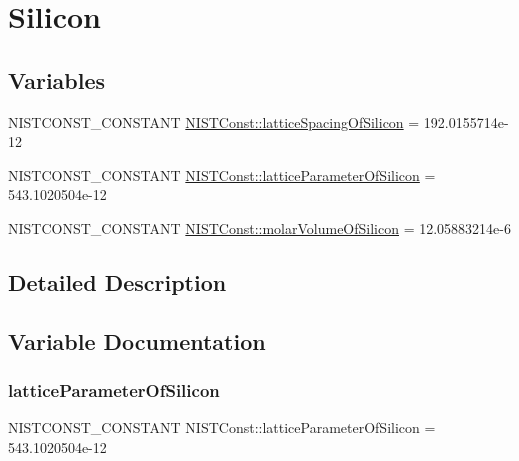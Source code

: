 \hypertarget{group___n_i_s_t_const-_silicon}{}\section{Silicon}
\label{group___n_i_s_t_const-_silicon}
\subsection*{Variables}
\begin{DoxyCompactItemize}
\item 
N\+I\+S\+T\+C\+O\+N\+S\+T\+\_\+\+C\+O\+N\+S\+T\+A\+NT \mbox{\hyperlink{group___n_i_s_t_const-_silicon_gadcadfe51b35f339a221e8ba56830b565}{N\+I\+S\+T\+Const\+::lattice\+Spacing\+Of\+Silicon}} = 192.\+0155714e-\/12
\item 
N\+I\+S\+T\+C\+O\+N\+S\+T\+\_\+\+C\+O\+N\+S\+T\+A\+NT \mbox{\hyperlink{group___n_i_s_t_const-_silicon_ga0941ec097c5c66b571eec8c5305f3aac}{N\+I\+S\+T\+Const\+::lattice\+Parameter\+Of\+Silicon}} = 543.\+1020504e-\/12
\item 
N\+I\+S\+T\+C\+O\+N\+S\+T\+\_\+\+C\+O\+N\+S\+T\+A\+NT \mbox{\hyperlink{group___n_i_s_t_const-_silicon_ga5bd73eb57f2a0142f761e2aee3afdcfb}{N\+I\+S\+T\+Const\+::molar\+Volume\+Of\+Silicon}} = 12.\+05883214e-\/6
\end{DoxyCompactItemize}


\subsection{Detailed Description}


\subsection{Variable Documentation}
\mbox{\label{group___n_i_s_t_const-_silicon_ga0941ec097c5c66b571eec8c5305f3aac}} 
\subsubsection{\texorpdfstring{lattice\+Parameter\+Of\+Silicon}{latticeParameterOfSilicon}}
{\footnotesize\ttfamily N\+I\+S\+T\+C\+O\+N\+S\+T\+\_\+\+C\+O\+N\+S\+T\+A\+NT N\+I\+S\+T\+Const\+::lattice\+Parameter\+Of\+Silicon = 543.\+1020504e-\/12}

